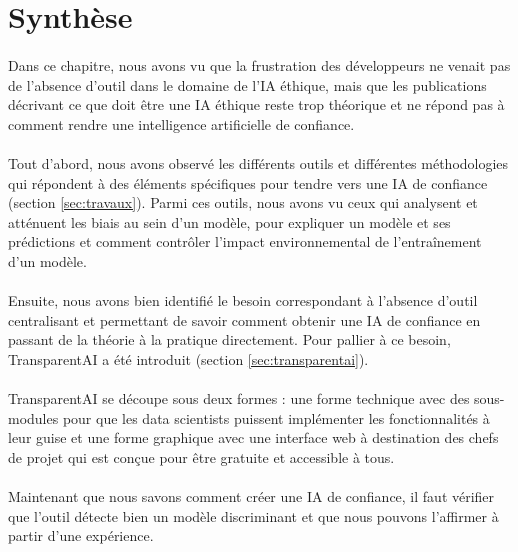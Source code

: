 \documentclass[10pt, french, a4paper]{report}
\begin{document}
\section{Synthèse}

\paragraph{}
Dans ce chapitre, nous avons vu que la frustration des développeurs ne venait pas de l'absence d'outil dans le domaine de l'IA éthique, mais que les publications décrivant ce que doit être une IA éthique reste trop théorique et ne répond pas à comment rendre une intelligence artificielle de confiance. 

\paragraph{}
Tout d'abord, nous avons observé les différents outils et différentes méthodologies qui répondent à des éléments spécifiques pour tendre vers une IA de confiance (section \ref{sec:travaux}). Parmi ces outils, nous avons vu ceux qui analysent et atténuent les biais au sein d'un modèle, pour expliquer un modèle et ses prédictions et comment contrôler l'impact environnemental de l'entraînement d'un modèle.

\paragraph{}
Ensuite, nous avons bien identifié le besoin correspondant à l'absence d'outil centralisant et permettant de savoir comment obtenir une IA de confiance en passant de la théorie à la pratique directement. Pour pallier à ce besoin, TransparentAI a été introduit (section \ref{sec:transparentai}).

\paragraph{}
TransparentAI se découpe sous deux formes : une forme technique avec des sous-modules pour que les data scientists puissent implémenter les fonctionnalités à leur guise et une forme graphique avec une interface web à destination des chefs de projet qui est conçue pour être gratuite et accessible à tous.

\paragraph{}
Maintenant que nous savons comment créer une IA de confiance, il faut vérifier que l'outil détecte bien un modèle discriminant et que nous pouvons l'affirmer à partir d'une expérience.
\end{document}
